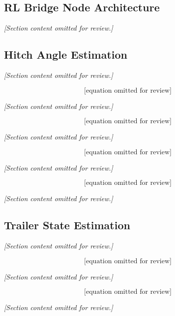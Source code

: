 \subsection{RL Bridge Node Architecture}
\textit{[Section content omitted for review.]}

\subsection{Hitch Angle Estimation}
\label{sec:hitch_estimation}
\textit{[Section content omitted for review.]}

\begin{equation}
\text{[equation omitted for review]}
\label{eq:hitch_roi_shift}
\end{equation}

\textit{[Section content omitted for review.]}

\begin{equation}
\text{[equation omitted for review]}
\label{eq:hitch_closeness}
\end{equation}

\textit{[Section content omitted for review.]}

\begin{equation}
\text{[equation omitted for review]}
\label{eq:hitch_fit}
\end{equation}

\textit{[Section content omitted for review.]}

\begin{equation}
\text{[equation omitted for review]}
\label{eq:hitch_raw_angle}
\end{equation}

\textit{[Section content omitted for review.]}

\subsection{Trailer State Estimation}
\textit{[Section content omitted for review.]}

\begin{equation}
\text{[equation omitted for review]}
\end{equation}

\textit{[Section content omitted for review.]}

\begin{equation}
\text{[equation omitted for review]}
\end{equation}

\textit{[Section content omitted for review.]}

